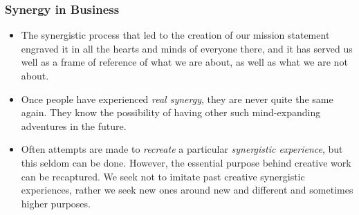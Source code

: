 \documentclass[11pt]{article}
\begin{document}
\subsubsection{Synergy in Business}
\begin{itemize}
\item The synergistic process that led to the creation of our mission statement engraved it in all the hearts and minds of everyone there, and it has served us well as a frame of reference of what we are about, as well as what we are not about.

\item Once people have experienced \emph{real synergy}, they are never quite the same again. They know the possibility of having other such mind-expanding adventures in the future.

\item Often attempts are made to \emph{recreate} a particular \emph{synergistic experience}, but this seldom can be done. However, the essential purpose behind creative work can be recaptured. We seek not to imitate past creative synergistic experiences, rather we seek new ones around new and different and sometimes higher purposes.
\end{itemize}
\end{document}
